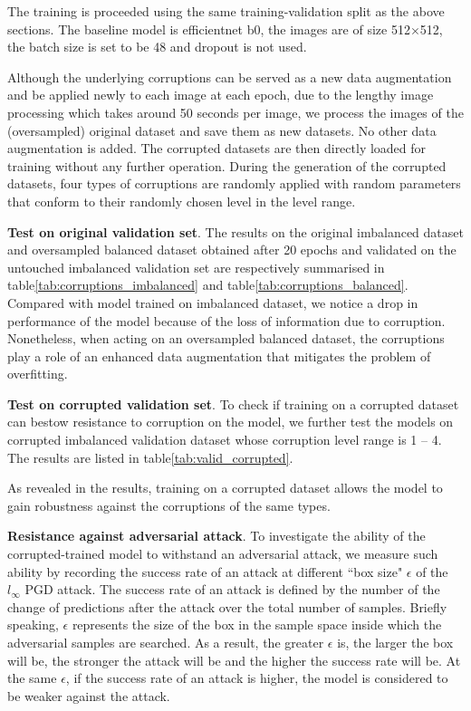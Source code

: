 \documentclass[../main.tex]{subfiles}
\begin{document}
The training is proceeded using the same training-validation split as the above sections. The baseline model is efficientnet b0, the images are of size 512$\times$512, the batch size is set to be 48 and dropout is not used.

Although the underlying corruptions can be served as a new data augmentation and be applied newly to each image at each epoch, due to the lengthy image processing which takes around 50 seconds per image, we process the images of the (oversampled) original dataset and save them as new datasets. No other data augmentation is added. The corrupted datasets are then directly loaded for training without any further operation. During the generation of the corrupted datasets, four types of corruptions are randomly applied with random parameters that conform to their randomly chosen level in the level range. 

\textbf{Test on original validation set}. The results on the original imbalanced dataset and oversampled balanced dataset obtained after 20 epochs and validated on the untouched imbalanced validation set are respectively summarised in table\ref{tab:corruptions_imbalanced} and table\ref{tab:corruptions_balanced}. Compared with model trained on imbalanced dataset, we notice a drop in performance of the model because of the loss of information due to corruption. Nonetheless, when acting on an oversampled balanced dataset, the corruptions play a role of an enhanced data augmentation that mitigates the problem of overfitting. 

\textbf{Test on corrupted validation set}. To check if training on a corrupted dataset can bestow resistance to corruption on the model, we further test the models on corrupted imbalanced validation dataset whose corruption level range is 1 -- 4. The results are listed in table\ref{tab:valid_corrupted}. 

As revealed in the results, training on a corrupted dataset allows the model to gain robustness against the corruptions of the same types. 

\textbf{Resistance against adversarial attack}. To investigate the ability of the corrupted-trained model to withstand an adversarial attack, we measure such ability by recording the success rate of an attack at different “box size" $\epsilon$ of the $l_{\infty}$ PGD attack\cite{madry_towards_2017}. The success rate of an attack is defined by the number of the change of predictions after the attack over the total number of samples. Briefly speaking, $\epsilon$ represents the size of the box in the sample space inside which the adversarial samples are searched. As a result, the greater $\epsilon$ is, the larger the box will be, the stronger the attack will be and the higher the success rate will be. At the same $\epsilon$, if the success rate of an attack is higher, the model is considered to be weaker against the attack.
\end{document}
